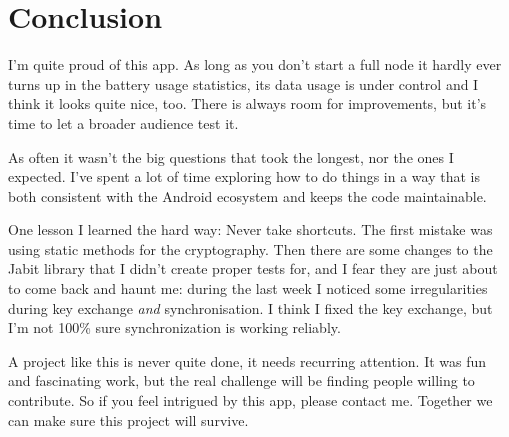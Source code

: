 \documentclass{bfh}
\begin{document}
  \newpage
  \section{Conclusion}

  I'm quite proud of this app. As long as you don’t start a full node it hardly ever turns up in the battery usage statistics, its data usage is under control and I think it looks quite nice, too. There is always room for improvements, but it's time to let a broader audience test it.

  As often it wasn't the big questions that took the longest, nor the ones I expected. I've spent a lot of time exploring how to do things in a way that is both consistent with the Android ecosystem and keeps the code maintainable.

  One lesson I learned the hard way: Never take shortcuts. The first mistake was using static methods for the cryptography. Then there are some changes to the Jabit library that I didn’t create proper tests for, and I fear they are just about to come back and haunt me: during the last week I noticed some irregularities during key exchange \textit{and} synchronisation. I think I fixed the key exchange, but I'm not 100\% sure synchronization is working reliably.

  A project like this is never quite done, it needs recurring attention. It was fun and fascinating work, but the real challenge will be finding people willing to contribute. So if you feel intrigued by this app, please contact me. Together we can make sure this project will survive.


  \newpage
  
  
\end{document}
